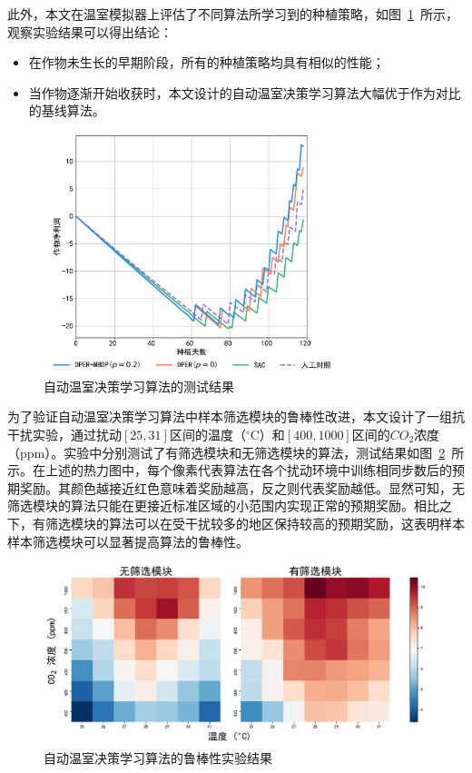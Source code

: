 此外，本文在温室模拟器上评估了不同算法所学习到的种植策略，如图~\ref{fig:acml-test}~所示，观察实验结果可以得出结论：

\begin{itemize}
    \item 在作物未生长的早期阶段，所有的种植策略均具有相似的性能；
    \item 当作物逐渐开始收获时，本文设计的自动温室决策学习算法大幅优于作为对比的基线算法。
\end{itemize}

\begin{figure}[ht]
\centering
\includegraphics[width=0.75\textwidth]{figures/acml-test.pdf}
\caption{自动温室决策学习算法的测试结果}
\label{fig:acml-test}
\end{figure}

为了验证自动温室决策学习算法中样本筛选模块的鲁棒性改进，本文设计了一组抗干扰实验，通过扰动$[25, 31]$区间的温度（$^\circ$C）和$[400, 1000]$区间的$CO_2$浓度（ppm）。实验中分别测试了有筛选模块和无筛选模块的算法，测试结果如图~\ref{fig:robustness}~所示。在上述的热力图中，每个像素代表算法在各个扰动环境中训练相同步数后的预期奖励。其颜色越接近红色意味着奖励越高，反之则代表奖励越低。显然可知，无筛选模块的算法只能在更接近标准区域的小范围内实现正常的预期奖励。相比之下，有筛选模块的算法可以在受干扰较多的地区保持较高的预期奖励，这表明样本样本筛选模块可以显著提高算法的鲁棒性。

\begin{figure}[ht]
\centering
\includegraphics[width=\textwidth]{figures/robustness-heatmap-for-iros.pdf}
\caption{自动温室决策学习算法的鲁棒性实验结果}
\label{fig:robustness}
\end{figure}

